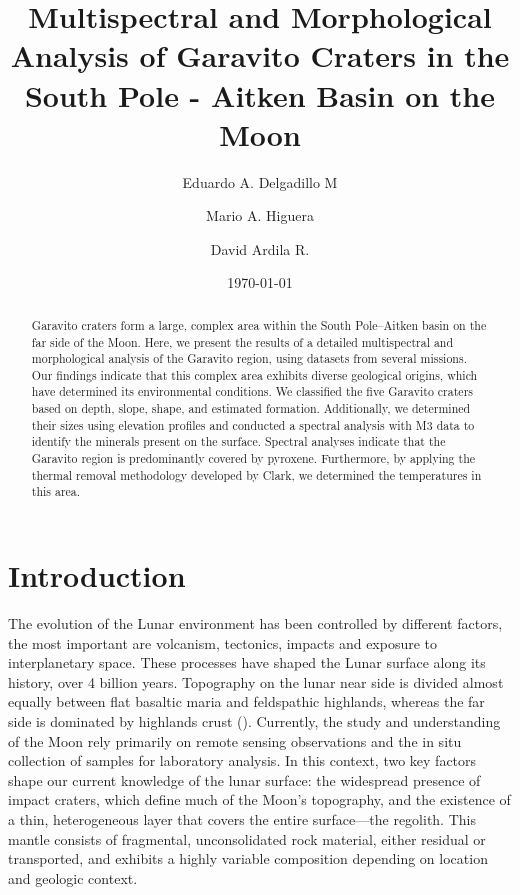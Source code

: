 \documentclass[aps,prd,nofootinbib,superscriptaddress,floatfix,longbibliography,author-year]{revtex4-2}
\begin{document}
\title{Multispectral and Morphological Analysis of Garavito Craters in the South Pole - Aitken Basin on the Moon}

\author{Eduardo A. Delgadillo M}
\author{Mario A. Higuera}

\author{David Ardila R.}

\date{\today}

\begin{abstract}
Garavito craters form a large, complex area within the South Pole–Aitken basin on the far side of the Moon. Here, we present the results of a detailed multispectral and morphological analysis of the Garavito region, using datasets from several missions. Our findings indicate that this complex area exhibits diverse geological origins, which have determined its environmental conditions.
We classified the five Garavito craters based on depth, slope, shape, and estimated formation. Additionally, we determined their sizes using elevation profiles and conducted a spectral analysis with M3 data to identify the minerals present on the surface. Spectral analyses indicate that the Garavito region is predominantly covered by pyroxene. Furthermore, by applying the thermal removal methodology developed by Clark, we determined the temperatures in this area.
\end{abstract}

\maketitle

\section{Introduction}
The evolution of the Lunar environment has been controlled by different factors, the most important are volcanism, tectonics, impacts and exposure to interplanetary space. These processes have shaped the Lunar surface along its history, over 4 billion years. Topography on the lunar near side is divided almost equally between flat basaltic maria and feldspathic highlands, whereas the far side is dominated by highlands crust (\cite{JAUMANN201215}).  Currently, the study and understanding of the Moon rely primarily on remote sensing observations and the in situ collection of samples for laboratory analysis. In this context, two key factors shape our current knowledge of the lunar surface: the widespread presence of impact craters, which define much of the Moon’s topography, and the existence of a thin, heterogeneous layer that covers the entire surface—the regolith. This mantle consists of fragmental, unconsolidated rock material, either residual or transported, and exhibits a highly variable composition depending on location and geologic context.\\
\end{document}
